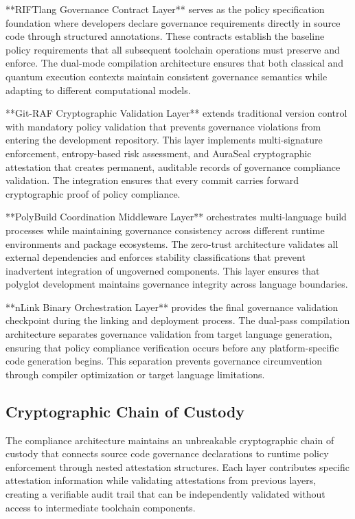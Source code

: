 **RIFTlang Governance Contract Layer** serves as the policy specification foundation where developers declare governance requirements directly in source code through structured annotations. These contracts establish the baseline policy requirements that all subsequent toolchain operations must preserve and enforce. The dual-mode compilation architecture ensures that both classical and quantum execution contexts maintain consistent governance semantics while adapting to different computational models.

**Git-RAF Cryptographic Validation Layer** extends traditional version control with mandatory policy validation that prevents governance violations from entering the development repository. This layer implements multi-signature enforcement, entropy-based risk assessment, and AuraSeal cryptographic attestation that creates permanent, auditable records of governance compliance validation. The integration ensures that every commit carries forward cryptographic proof of policy compliance.

**PolyBuild Coordination Middleware Layer** orchestrates multi-language build processes while maintaining governance consistency across different runtime environments and package ecosystems. The zero-trust architecture validates all external dependencies and enforces stability classifications that prevent inadvertent integration of ungoverned components. This layer ensures that polyglot development maintains governance integrity across language boundaries.

**nLink Binary Orchestration Layer** provides the final governance validation checkpoint during the linking and deployment process. The dual-pass compilation architecture separates governance validation from target language generation, ensuring that policy compliance verification occurs before any platform-specific code generation begins. This separation prevents governance circumvention through compiler optimization or target language limitations.

\subsection{Cryptographic Chain of Custody}

The compliance architecture maintains an unbreakable cryptographic chain of custody that connects source code governance declarations to runtime policy enforcement through nested attestation structures. Each layer contributes specific attestation information while validating attestations from previous layers, creating a verifiable audit trail that can be independently validated without access to intermediate toolchain components.

